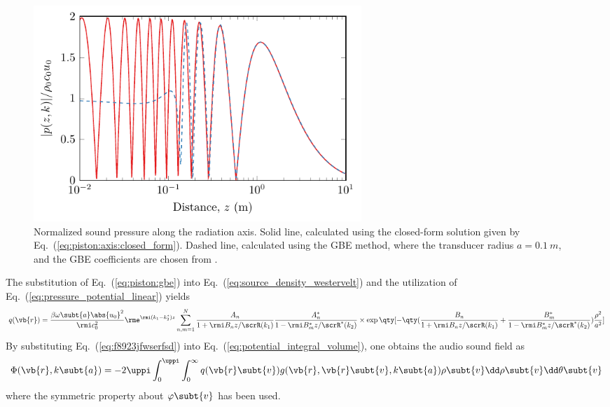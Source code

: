 \begin{figure}[htb]
    \centering
    \includegraphics[width = 0.6\textwidth]{fig/CircPistonAxis_GBE_demo1_Wen1988JASA.pdf}
    \caption{Normalized sound pressure along the radiation axis. Solid line, calculated using the closed-form solution given by Eq.~(\ref{eq:piston:axis:closed_form}). Dashed line, calculated using the GBE method, where the transducer radius $a=\SI{0.1}{m}$, and the GBE coefficients are chosen from \cite{Wen1988DiffractionBeamField}.}
    \label{fig:piston_axis_compare}
\end{figure}


The substitution of Eq.~(\ref{eq:piston:gbe}) into Eq.~(\ref{eq:source_density_westervelt}) and the utilization of Eq.~(\ref{eq:pressure_potential_linear}) yields
\begin{dmath}
    q(\vb{r})
    =
    \frac{\beta\omega\subt{a} \abs{u_0}^2}{\rmi c_0^2}
    \rme^{\rmi (k_1-k_2^*) z}
    \sum_{n,m=1}^N
    \frac{A_n}{1+\rmi B_n z/\scrR(k_1)}
    \frac{A_n^*}{1-\rmi B_m^* z/\scrR^*(k_2)}
    \\ \times
    \exp\qty[-\qty(\frac{B_n}{1+\rmi B_n z/\scrR(k_1)} + 
    \frac{B_m^*}{1-\rmi B_m^* z/\scrR^*(k_2)}) \frac{\rho^2}{a^2}]
    \label{eq:f8923jfwserfsd}
\end{dmath}
By substituting Eq.~(\ref{eq:f8923jfwserfsd}) into Eq.~(\ref{eq:potential_integral_volume}), one obtains the audio sound field as 
\begin{equation}
    \Phi(\vb{r},k\subt{a})
    =
    -2\uppi
    \int_0^\uppi \int_0^\infty
    q(\vb{r}\subt{v})
    g(\vb{r},\vb{r}\subt{v}, k\subt{a})
    \rho\subt{v}
    \dd \rho\subt{v}\dd\theta\subt{v}
    \label{eq:sf982wf}
\end{equation}
where the symmetric property about $\varphi\subt{v}$ has been used. 

